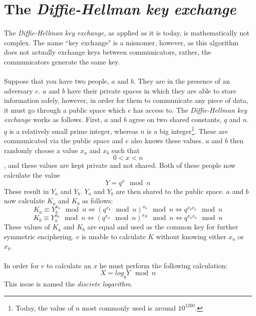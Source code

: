 \documentclass[a4paper, 12pt]{article}
\begin{document}
\section{The \textit{Diffie-Hellman key exchange}}
\paragraph*{}
The \textit{Diffie-Hellman key exchange}, as applied as it is today, is mathematically not complex. The name ``key 
exchange" is a misnomer, however, as this algorithm does not actually exchange keys between communicators, rather, the 
communicators generate the same key.

\paragraph*{}
Suppose that you have two people, $a$ and $b$. They are in the presence of an adversary $e$. $a$ and $b$ have their 
private spaces in which they are able to store information safely, however, in order for them to communicate any piece 
of data, it must go through a public space which $e$ has access to. The \textit{Diffie-Hellman key exchange} works as 
follows.
First, $a$ and $b$ agree on two shared constants, $q$ and $n$. $q$ is a relatively small prime integer, whereas $n$ is 
a big integer\footnote{Today, the value of $n$ most commonly used is around $10^{1200}$.}. These are communicated via 
the public space and $e$ also knows these values. $a$ and $b$ then randomly choose a value $x_a$ and $x_b$ such that 
$$0 < x < n$$, and these values are kept private and not shared. Both of these people now calculate the value
$$Y = q^x \mod n$$
These result in $Y_a$ and $Y_b$. $Y_a$ and $Y_b$ are then shared to the public space. $a$ and $b$ now calculate
 $K_a$ and $K_b$ as follows:
$$K_a \equiv Y_b^{x_a} \mod n \Longleftrightarrow (q^{x_b} \mod n)^{x_a} \mod n \Longleftrightarrow q^{x_b x_a} \mod n$$
$$K_b \equiv Y_a^{x_b} \mod n \Longleftrightarrow (q^{x_a} \mod n)^{x_B} \mod n \Longleftrightarrow q^{x_a x_b} \mod n$$
These values of $K_a$ and $K_b$ are equal and used as the common key for further symmetric enciphering. $e$ is unable 
to calculate $K$ without knowing either $x_a$ or $x_b$.

\paragraph*{}
In order for $e$ to calculate an $x$ he must perform the following calculation:
$$X = log_q Y \mod n$$
This issue is named the \textit{discrete logarithm}.
\end{document}
